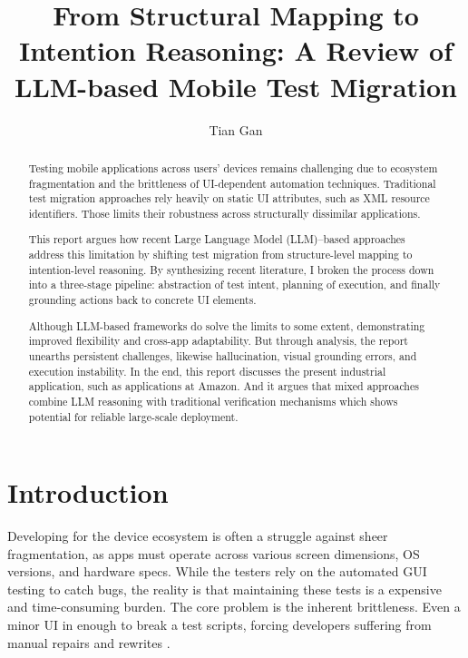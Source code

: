 \documentclass[acmsmall,nonacm]{acmart}
\begin{document}
\title{From Structural Mapping to Intention Reasoning: A Review of LLM-based Mobile Test Migration}

\author{Tian Gan}

\begin{abstract}
Testing mobile applications across users' devices remains challenging due to ecosystem fragmentation and the brittleness of UI-dependent automation techniques. Traditional test migration approaches rely heavily on static UI attributes, such as XML resource identifiers. Those limits their robustness across structurally dissimilar applications. 

This report argues how recent Large Language Model (LLM)–based approaches address this limitation by shifting test migration from structure-level mapping to intention-level reasoning. By synthesizing recent literature, I broken the process down into a three-stage pipeline: abstraction of test intent, planning of execution, and finally grounding actions back to concrete UI elements. 

Although LLM-based frameworks do solve the limits to some extent, demonstrating improved flexibility and cross-app adaptability. But through analysis, the report unearths persistent challenges, likewise hallucination, visual grounding errors, and execution instability. In the end, this report discusses the present industrial application, such as applications at Amazon. And it argues that mixed approaches combine LLM reasoning with traditional verification mechanisms which shows potential for reliable large-scale deployment.
\end{abstract}


\maketitle

\section{Introduction}
Developing for the device ecosystem is often a struggle against sheer fragmentation, as apps must operate across various screen dimensions, OS versions, and hardware specs. While the testers rely on the automated GUI testing to catch bugs, the reality is that maintaining these tests is a expensive and time-consuming burden. The core problem is the inherent brittleness. Even a minor UI in enough to break a test scripts, forcing developers suffering from manual repairs and rewrites  \cite{10.1145/3236024.3236055,8952228}.
\end{document}
